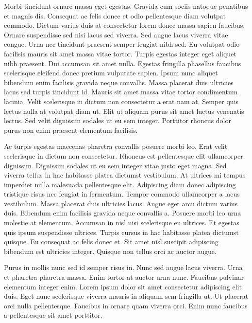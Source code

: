 \documentclass[11pt,a4paper]{article}
\begin{document}
Morbi tincidunt ornare massa eget egestas. Gravida cum sociis natoque penatibus et magnis dis. Consequat ac felis donec et odio pellentesque diam volutpat commodo. Dictum varius duis at consectetur lorem donec massa sapien faucibus. Ornare suspendisse sed nisi lacus sed viverra. Sed augue lacus viverra vitae congue. Urna nec tincidunt praesent semper feugiat nibh sed. Eu volutpat odio facilisis mauris sit amet massa vitae tortor. Turpis egestas integer eget aliquet nibh praesent. Dui accumsan sit amet nulla. Egestas fringilla phasellus faucibus scelerisque eleifend donec pretium vulputate sapien. Ipsum nunc aliquet bibendum enim facilisis gravida neque convallis. Massa placerat duis ultricies lacus sed turpis tincidunt id. Mauris sit amet massa vitae tortor condimentum lacinia. Velit scelerisque in dictum non consectetur a erat nam at. Semper quis lectus nulla at volutpat diam ut. Elit ut aliquam purus sit amet luctus venenatis lectus. Sed velit dignissim sodales ut eu sem integer. Porttitor rhoncus dolor purus non enim praesent elementum facilisis.

Ac turpis egestas maecenas pharetra convallis posuere morbi leo. Erat velit scelerisque in dictum non consectetur. Rhoncus est pellentesque elit ullamcorper dignissim. Dignissim sodales ut eu sem integer vitae justo eget magna. Sed viverra tellus in hac habitasse platea dictumst vestibulum. At ultrices mi tempus imperdiet nulla malesuada pellentesque elit. Adipiscing diam donec adipiscing tristique risus nec feugiat in fermentum. Tempor commodo ullamcorper a lacus vestibulum. Massa placerat duis ultricies lacus. Augue eget arcu dictum varius duis. Bibendum enim facilisis gravida neque convallis a. Posuere morbi leo urna molestie at elementum. Accumsan in nisl nisi scelerisque eu ultrices. Et egestas quis ipsum suspendisse ultrices. Turpis cursus in hac habitasse platea dictumst quisque. Eu consequat ac felis donec et. Sit amet nisl suscipit adipiscing bibendum est ultricies integer. Quisque non tellus orci ac auctor augue.

Purus in mollis nunc sed id semper risus in. Nunc sed augue lacus viverra. Urna et pharetra pharetra massa. Enim tortor at auctor urna nunc. Faucibus pulvinar elementum integer enim. Lorem ipsum dolor sit amet consectetur adipiscing elit duis. Eget nunc scelerisque viverra mauris in aliquam sem fringilla ut. Ut placerat orci nulla pellentesque. Faucibus in ornare quam viverra orci. Enim nunc faucibus a pellentesque sit amet porttitor.
\end{document}
